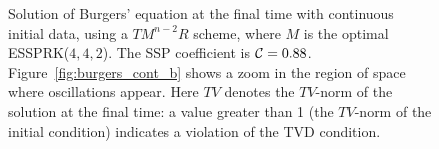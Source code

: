 \begin{figure}
    \centering
    \;
    \caption{Solution of Burgers' equation at the final time with continuous initial data, using a
    $TM^{n-2}R$ scheme, where $M$ is the optimal ESSPRK($4,4,2$). 
    The SSP coefficient is $\mathcal{C} = 0.88$. 
    Figure~\ref{fig:burgers_cont_b} shows a zoom in the region of space where
    oscillations appear.
    Here $TV$ denotes the $TV$-norm of the solution at the final time:
    a value greater than 1 (the $TV$-norm of the initial condition)
    indicates a violation of the TVD condition.
    }
    \label{fig:burgers_cont}
\end{figure}


